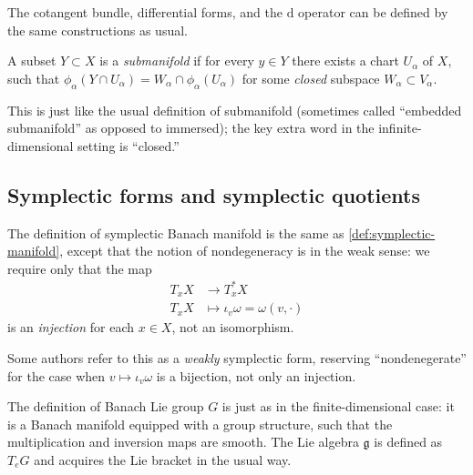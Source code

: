 \documentclass[12pt,letterpaper,reqno]{article}
\numberwithin{equation}{section}
\newcommand{\fg}{{\mathfrak g}}
\newcommand{\de}{\mathrm{d}}
\newcommand{\ti}[1]{\textit{#1}}
\newcommand{\fixme}[1]{{\color{orange}{[#1]}}}
\begin{document}
\begin{defn} The cotangent bundle, 
differential forms, and the $\de$ operator can be defined by the same 
constructions as usual.
\end{defn}

\begin{defn}[Submanifold] A subset $Y \subset X$ is a \ti{submanifold}
if for every $y \in Y$ there exists a chart $U_\alpha$ of $X$, 
such that $\phi_\alpha(Y \cap U_\alpha) = W_\alpha \cap \phi_\alpha(U_\alpha)$
for some \ti{closed} subspace $W_\alpha \subset V_\alpha$.
\end{defn}

This is just like the usual definition of submanifold
(sometimes called ``embedded submanifold'' as opposed to immersed);
the key extra word in the infinite-dimensional setting
is ``closed.''



\subsection{Symplectic forms and symplectic quotients}

\begin{defn}
The definition of symplectic Banach manifold is the same as
\autoref{def:symplectic-manifold}, except that the notion
of nondegeneracy is in the weak sense: we require only that
the map
\begin{align}
  T_x X &\to T^*_x X \\
  T_x X &\mapsto \iota_v \omega = \omega(v,\cdot)
\end{align}
is an \ti{injection} for each $x \in X$,
not an isomorphism.
\end{defn}

Some authors refer to this as a \ti{weakly} symplectic
form, reserving ``nondenegerate'' for the case when
$v \mapsto \iota_v \omega$ is a bijection, not only an injection.

\begin{defn}
The definition of Banach Lie group $G$ is just as in the 
finite-dimensional case: it is a 
Banach manifold equipped with a group structure,
such that the multiplication and inversion maps
are smooth. The Lie algebra $\fg$ is defined as
$T_e G$ and acquires the Lie bracket in the usual way.
\fixme{ref Neeb on Infinite-Dimensional Lie Groups?}
\end{defn}
\end{document}
